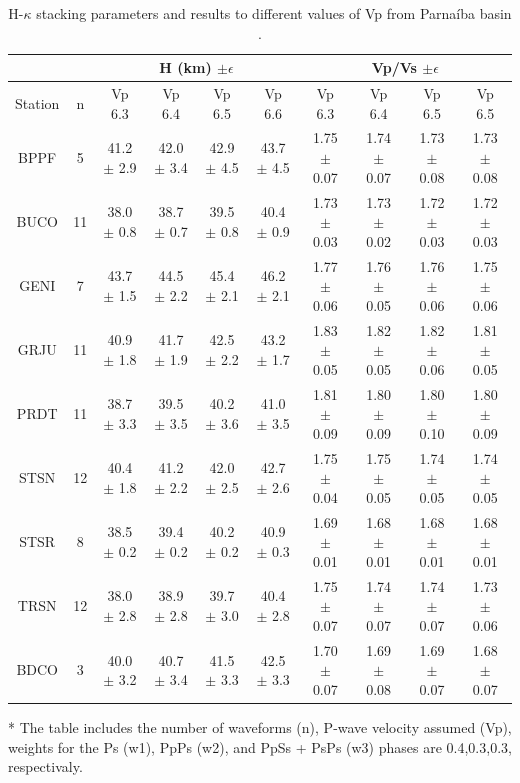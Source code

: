 \documentclass[paper,11pt]{geophysics}
\begin{document}
\begin{table}[! htpb]
\centering
\tiny
	\begin{threeparttable}
\caption{H-$\kappa$ stacking parameters and results to different values of Vp from Parnaíba basin .}
\label{tabela_hk_stacking}
\begin{tabular}{cc|cccc|cccc}
 &  & \multicolumn{4}{|c|}{H (km) $\pm \epsilon$} & \multicolumn{4}{|c|}{Vp/Vs $\pm \epsilon$} \\ \hline
Station & n & Vp 6.3 & Vp 6.4 & Vp 6.5 & Vp 6.6 & Vp 6.3 & Vp 6.4 & Vp 6.5 & Vp 6.5\\ \hline
BPPF & 5  & 41.2 $\pm$ 2.9 & 42.0 $\pm$ 3.4 & 42.9 $\pm$ 4.5 & 43.7 $\pm$ 4.5 & 1.75 $\pm$ 0.07 & 1.74 $\pm$ 0.07 & 1.73 $\pm$ 0.08	 & 1.73 $\pm$ 0.08 \\
BUCO & 11 & 38.0 $\pm$ 0.8 & 38.7 $\pm$ 0.7 & 39.5 $\pm$ 0.8 & 40.4 $\pm$ 0.9 & 1.73 $\pm$ 0.03 & 1.73 $\pm$ 0.02 & 1.72 $\pm$ 0.03  & 1.72 $\pm$ 0.03 \\
GENI & 7  & 43.7 $\pm$ 1.5 & 44.5 $\pm$ 2.2 & 45.4 $\pm$ 2.1 & 46.2 $\pm$ 2.1 & 1.77 $\pm$ 0.06 & 1.76 $\pm$ 0.05 & 1.76 $\pm$ 0.06	 & 1.75 $\pm$ 0.06 \\
GRJU & 11 & 40.9 $\pm$ 1.8 & 41.7 $\pm$ 1.9 & 42.5 $\pm$ 2.2 & 43.2 $\pm$ 1.7 & 1.83 $\pm$ 0.05 & 1.82 $\pm$ 0.05 & 1.82 $\pm$ 0.06	 & 1.81 $\pm$ 0.05 \\
PRDT & 11 & 38.7 $\pm$ 3.3 & 39.5 $\pm$ 3.5 & 40.2 $\pm$ 3.6 & 41.0 $\pm$ 3.5 & 1.81 $\pm$ 0.09 & 1.80 $\pm$ 0.09 & 1.80 $\pm$ 0.10	 & 1.80 $\pm$ 0.09 \\
STSN & 12 & 40.4 $\pm$ 1.8 & 41.2 $\pm$ 2.2 & 42.0 $\pm$ 2.5 & 42.7 $\pm$ 2.6 & 1.75 $\pm$ 0.04 & 1.75 $\pm$ 0.05 & 1.74 $\pm$ 0.05	 & 1.74 $\pm$ 0.05 \\
STSR & 8  & 38.5 $\pm$ 0.2 & 39.4 $\pm$ 0.2 & 40.2 $\pm$ 0.2 & 40.9 $\pm$ 0.3 & 1.69 $\pm$ 0.01 & 1.68 $\pm$ 0.01 & 1.68 $\pm$ 0.01	 & 1.68 $\pm$ 0.01 \\
TRSN & 12 & 38.0 $\pm$ 2.8 & 38.9 $\pm$ 2.8 & 39.7 $\pm$ 3.0 & 40.4 $\pm$ 2.8 & 1.75 $\pm$ 0.07 & 1.74 $\pm$ 0.07 & 1.74 $\pm$ 0.07	 & 1.73 $\pm$ 0.06 \\
BDCO & 3  & 40.0 $\pm$ 3.2 & 40.7 $\pm$ 3.4 & 41.5 $\pm$ 3.3 & 42.5 $\pm$ 3.3 & 1.70 $\pm$ 0.07 & 1.69 $\pm$ 0.08 & 1.69 $\pm$ 0.07  & 1.68 $\pm$ 0.07 \\ \hline
\end{tabular}
	\begin{tablenotes}\footnotesize
	\item[*] The table includes the number of waveforms (n), P-wave velocity assumed (Vp), weights for the Ps (w1), PpPs (w2), and PpSs + PsPs (w3) phases are 0.4,0.3,0.3, respectivaly.
    \end{tablenotes}
    \label{tabela_hk_stacking}
	\end{threeparttable}
\end{table}
\end{document}
